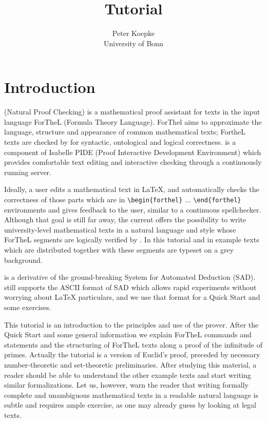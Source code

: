 \documentclass[11pt]{article}
\author{Peter Koepke\\University of Bonn}
\title{\textbf{\Naproche{} Tutorial}}
\begin{document}
\newcommand{\Prod}[3]{#1_{#2} \cdots #1_{#3}}
\newcommand{\Seq}[2]{\{#1,\dots,#2\}}
\newcommand{\Finset}[3]{\{#1_{#2},\dots,#1_{#3}\}}
\newcommand{\Primes}{\mathbb{P}}

\maketitle

\section{Introduction}
\Naproche{} (Natural Proof Checking) is a mathematical proof assistant
for texts in the input language ForTheL (Formula Theory Language).
ForThel aims to approximate the
language, structure and appearance of common mathematical texts;
FortheL texts are checked by \Naproche{} for syntactic, ontological
and logical correctness. \Naproche{} is a component of
Isabelle PIDE (Proof Interactive Development Environment) which provides
comfortable text editing and interactive checking through a continuously
running \Naproche{} server.

Ideally, a user edits a mathematical text in \LaTeX{}, and
\Naproche{} automatically checks the correctness of those parts which are
in \verb+\begin+\verb+{forthel}+ ... \verb+\end{forthel}+ 
environments and gives
feedback to the user, similar to a continuous spellchecker.
Although that goal is still far away, the current \Naproche{} offers
the possibility to write university-level mathematical texts 
in a natural language and style whose ForTheL segments are logically
verified by \Naproche{}. In this tutorial and in example texts
which are distributed together with \Naproche{} these segments
are typeset on a grey background.

\Naproche{} is a derivative of the ground-breaking System 
for Automated Deduction (SAD). \Naproche{} still supports the 
ASCII format  of SAD which allows rapid 
experiments without worrying about LaTeX particulars, and we
use that format for a Quick Start and some exercises. 

This tutorial is an introduction to the principles and
use of the \Naproche{} prover. After the Quick Start and 
some general information we explain 
ForTheL commands and statements and the structuring of ForTheL texts
along a proof of the infinitude of primes. Actually the tutorial is 
a version of Euclid's proof, preceded by 
necessary number-theoretic and set-theoretic preliminaries.
After studying this material, a reader should be able to understand the
other example texts and start writing similar formalizations.
Let us, however, warn the reader that writing formally complete
and unambiguous mathematical texts in a readable natural language 
is subtle and requires ample exercise, as one may already guess by
looking at legal texts.
\end{document}
